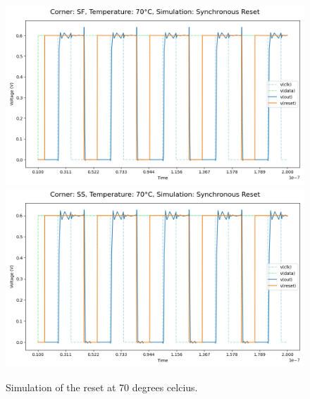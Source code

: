 \begin{figure}[H]
    \vspace{5pt}
    \includegraphics[height= 0.21\textheight]{figures/aimspice/0.600_0.1u_0.1u_0.3u_0.1u/functionality/SF70W3.png}
    \vspace{5pt}
    \includegraphics[height= 0.21\textheight]{figures/aimspice/0.600_0.1u_0.1u_0.3u_0.1u/functionality/SS70W3.png}
    \caption{Simulation of the reset at 70 degrees celcius.}
    \label{fig:aimspice_W3_70}
\end{figure}

